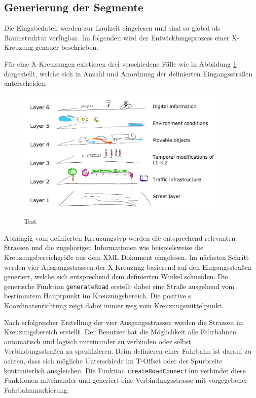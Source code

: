 \subsection{Generierung der Segmente}
Die Eingabedaten werden zur Laufzeit eingelesen und sind so global als Baumstruktur verfügbar. Im folgenden wird der Entwicklungsprozess einer X-Kreuzung genauer beschrieben. 

Für eine X-Kreuzungen existieren drei verschiedene Fälle wie in Abbildung \ref{abb4} dargestellt, welche sich in Anzahl und Anordnung der definierten Eingangsstraßen unterscheiden.

\begin{figure}[h]
	\flushleft
	\includegraphics[width=0.95\textwidth]{fig/fig1.png}
	\caption{Test \cite{Donges.1982,Werling.2017}}
	\label{abb4}
\end{figure}

Abhängig vom definierten Kreuzungstyp werden die entsprechend relevanten Strassen und die zugehörigen Informationen wie beispielsweise die Kreuzungsbereichgröße aus dem XML Dokument eingelesen. Im nächsten Schritt werden vier Ausgangsstrassen der X-Kreuzung basierend auf den Eingangsstraßen generiert, welche sich entsprechend dem definierten Winkel schneiden. Die generische Funktion \texttt{generateRoad} erstellt dabei eine Straße ausgehend vom bestimmtem Hauptpunkt im Kreuzungsbereich. Die positive s Koordinatenrichtung zeigt dabei immer weg vom Kreuzungsmittelpunkt. 

Nach erfolgreicher Erstellung der vier Ausgangsstrassen werden die Strassen im Kreuzungsbereich erstellt. Der Benutzer hat die Möglichkeit alle Fahrbahnen automatisch und logisch miteinander zu verbinden oder selbst Verbindungsstraßen zu spezifizieren. Beim definieren einer Fahrbahn ist darauf zu achten, dass sich mögliche Unterschiede im T-Offset oder der Spurbreite kontinuierlich ausgleichen. Die Funktion \texttt{createRoadConnection} verbindet diese Funktionen miteinander und generiert eine Verbindungsstrasse mit vorgegebener Fahrbahnmarkierung. 

